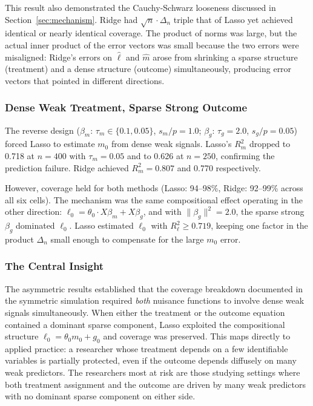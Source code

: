 \documentclass[a4paper,10.5pt]{article}
\begin{document}
This result also demonstrated the Cauchy-Schwarz looseness discussed in Section~\ref{sec:mechanism}. Ridge had $\sqrt{n}\cdot\Delta_n$ triple that of Lasso yet achieved identical or nearly identical coverage. The product of norms was large, but the actual inner product of the error vectors was small because the two errors were misaligned: Ridge's errors on $\hat{\ell}$ and $\hat{m}$ arose from shrinking a sparse structure (treatment) and a dense structure (outcome) simultaneously, producing error vectors that pointed in different directions.


\subsubsection*{Dense Weak Treatment, Sparse Strong Outcome}

The reverse design ($\beta_m$: $\tau_m \in \{0.1, 0.05\}$, $s_m/p = 1.0$; $\beta_g$: $\tau_g = 2.0$, $s_g/p = 0.05$) forced Lasso to estimate $m_0$ from dense weak signals. Lasso's $R^2_m$ dropped to 0.718 at $n = 400$ with $\tau_m = 0.05$ and to 0.626 at $n = 250$, confirming the prediction failure. Ridge achieved $R^2_m = 0.807$ and 0.770 respectively.

However, coverage held for both methods (Lasso: 94--98\%, Ridge: 92--99\% across all six cells). The mechanism was the same compositional effect operating in the other direction: $\ell_0 = \theta_0 \cdot X\beta_m + X\beta_g$, and with $\|\beta_g\|^2 = 2.0$, the sparse strong $\beta_g$ dominated $\ell_0$. Lasso estimated $\ell_0$ with $R^2_\ell \geq 0.719$, keeping one factor in the product $\Delta_n$ small enough to compensate for the large $m_0$ error.


\subsubsection*{The Central Insight}

The asymmetric results established that the coverage breakdown documented in the symmetric simulation required \emph{both} nuisance functions to involve dense weak signals simultaneously. When either the treatment or the outcome equation contained a dominant sparse component, Lasso exploited the compositional structure $\ell_0 = \theta_0 m_0 + g_0$ and coverage was preserved. This maps directly to applied practice: a researcher whose treatment depends on a few identifiable variables is partially protected, even if the outcome depends diffusely on many weak predictors. The researchers most at risk are those studying settings where both treatment assignment and the outcome are driven by many weak predictors with no dominant sparse component on either side.
\end{document}
